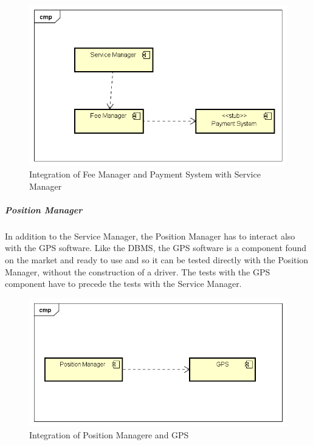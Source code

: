 \begin{figure}[H]	
	\centering
	\includegraphics[width=\textwidth]{img/FeeMan_SrvMan_int}
	\caption{Integration of Fee Manager and Payment System with Service Manager}
\end{figure}

\subparagraph{Position Manager}
In addition to the Service Manager, the Position Manager has to interact also with the GPS software. Like the DBMS, the GPS software is a component found on the market and ready to use and so it can be tested directly with the Position Manager, without the construction of a driver. The tests with the GPS component have to precede the tests with the Service Manager.


\begin{figure}[H]	
	\centering
	\includegraphics[width=\textwidth]{img/PosMan_GPS_int}
	\caption{Integration of Position Managere and GPS}
\end{figure}


